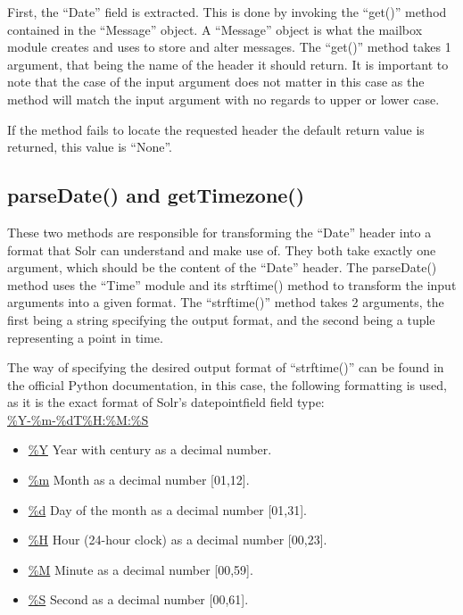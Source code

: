 \documentclass[a4paper,english]{report}
\begin{document}


First, the “Date” field is extracted. This is done by invoking the “get()” method contained in the “Message” object. A “Message” object is what the mailbox module creates and uses to store and alter messages.
The “get()” method takes 1 argument, that being the name of the header it should return. It is important to note that the case of the input argument does not matter in this case as the method will match the input argument with no regards to upper or lower case.

If the method fails to locate the requested header the default return value is returned, this value is “None”.



\subsection{parseDate() and getTimezone()}

These two methods are responsible for transforming the “Date” header into a format that Solr can understand and make use of. They both take exactly one argument, which should be the content of the “Date” header.
The parseDate() method uses the “Time” module and its strftime() method to transform the input arguments into a given format. The “strftime()” method takes 2 arguments, the first being a string specifying the output format, and the second being a tuple representing a point in time.

The way of specifying the desired output format of “strftime()” can be found in the official Python documentation, in this case, the following formatting is used, as it is the exact format of Solr's datepointfield field type: \\

\url{%Y-%m-%dT%H:%M:%S}

\begin{itemize}

\item \url{%Y} Year with century as a decimal number.


\item \url{%m} Month as a decimal number [01,12].


\item \url{%d} Day of the month as a decimal number [01,31].


\item \url{%H} Hour (24-hour clock) as a decimal number [00,23].


\item \url{%M} Minute as a decimal number [00,59].


\item \url{%S} Second as a decimal number [00,61].


\end{itemize}
\end{document}
